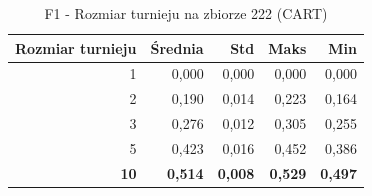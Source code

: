 \begin{table}[htbp]
\centering
\small
\setlength{\tabcolsep}{6pt}
\renewcommand{\arraystretch}{1.2}
\caption{F1 - Rozmiar turnieju na zbiorze 222 (CART)}
\label{tab:CART_tournament_size_222_f1}
\begin{tabular}{r|r|r|r|r}
\toprule
Rozmiar turnieju & Średnia & Std & Maks & Min \\
\hline
1 & 0,000 & 0,000 & 0,000 & 0,000 \\
2 & 0,190 & 0,014 & 0,223 & 0,164 \\
3 & 0,276 & 0,012 & 0,305 & 0,255 \\
5 & 0,423 & 0,016 & 0,452 & 0,386 \\
\textbf{10} & \textbf{0,514} & \textbf{0,008} & \textbf{0,529} & \textbf{0,497} \\
\bottomrule
\end{tabular}
\end{table}